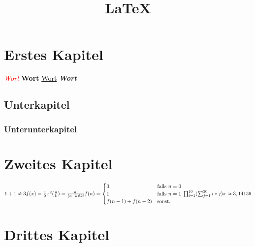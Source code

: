 \documentclass{report}
\title{LaTeX}
\begin{document}

\maketitle

\tableofcontents
\newpage

\section{Erstes Kapitel}
\textcolor{red}{\textit{\LARGE Wort}}
\textbf{Wort}
\underline{Wort}
\textbf{\textit{Wort}}

\subsection{Unterkapitel}
\subsubsection{Unterunterkapitel}
\section{Zweites Kapitel}
\begin{math}
1 + 1 \neq 3 \\
f(x) = \frac{1}{2} x^2 \\
(\frac{n}{k}) = \frac{n!}{(n - k)! k!}\\
f(n) = \begin{cases}
      0, & \text{falls}\ n=0 \\
      1, & \text{falls}\ n=1 \\
      f(n - 1) + f(n - 2) & \text{sonst.}
    \end{cases}\\
\prod_{i=1}^{10} (\sum_{j=1}^{20} i * j)
\pi \approx 3,14159
\end{math}
\section{Drittes Kapitel}
\end{document}

